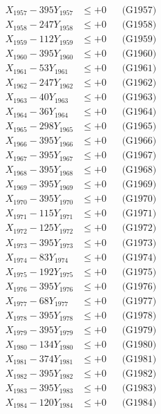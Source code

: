 \documentclass[a4paper,10pt]{article}
\begin{document}
{\begin{align}
X_{1957} - 395Y_{1957} &\leq +0 && \text{(G1957)} \\
X_{1958} - 247Y_{1958} &\leq +0 && \text{(G1958)} \\
X_{1959} - 112Y_{1959} &\leq +0 && \text{(G1959)} \\
X_{1960} - 395Y_{1960} &\leq +0 && \text{(G1960)} \\
\allowbreak
X_{1961} - 53Y_{1961} &\leq +0 && \text{(G1961)} \\
X_{1962} - 247Y_{1962} &\leq +0 && \text{(G1962)} \\
X_{1963} - 40Y_{1963} &\leq +0 && \text{(G1963)} \\
X_{1964} - 36Y_{1964} &\leq +0 && \text{(G1964)} \\
X_{1965} - 298Y_{1965} &\leq +0 && \text{(G1965)} \\
X_{1966} - 395Y_{1966} &\leq +0 && \text{(G1966)} \\
X_{1967} - 395Y_{1967} &\leq +0 && \text{(G1967)} \\
X_{1968} - 395Y_{1968} &\leq +0 && \text{(G1968)} \\
X_{1969} - 395Y_{1969} &\leq +0 && \text{(G1969)} \\
X_{1970} - 395Y_{1970} &\leq +0 && \text{(G1970)} \\
\allowbreak
X_{1971} - 115Y_{1971} &\leq +0 && \text{(G1971)} \\
X_{1972} - 125Y_{1972} &\leq +0 && \text{(G1972)} \\
X_{1973} - 395Y_{1973} &\leq +0 && \text{(G1973)} \\
X_{1974} - 83Y_{1974} &\leq +0 && \text{(G1974)} \\
X_{1975} - 192Y_{1975} &\leq +0 && \text{(G1975)} \\
X_{1976} - 395Y_{1976} &\leq +0 && \text{(G1976)} \\
X_{1977} - 68Y_{1977} &\leq +0 && \text{(G1977)} \\
X_{1978} - 395Y_{1978} &\leq +0 && \text{(G1978)} \\
X_{1979} - 395Y_{1979} &\leq +0 && \text{(G1979)} \\
X_{1980} - 134Y_{1980} &\leq +0 && \text{(G1980)} \\
\allowbreak
X_{1981} - 374Y_{1981} &\leq +0 && \text{(G1981)} \\
X_{1982} - 395Y_{1982} &\leq +0 && \text{(G1982)} \\
X_{1983} - 395Y_{1983} &\leq +0 && \text{(G1983)} \\
X_{1984} - 120Y_{1984} &\leq +0 && \text{(G1984)} \\

\end{align}}
\end{document}
